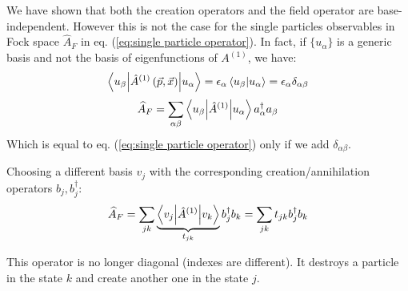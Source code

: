 We have shown that both the creation operators and the field operator are base-independent. However this is not the case for the single particles observables in Fock space $\widehat A_F$ in eq. (\ref{eq:single particle operator}). In fact, if $\{u_\alpha\}$ is a generic basis and not the basis of eigenfunctions of $A^{(1)}$, we have:
$$ \left\langle u_\beta \middle| \hat A^{(1)}\left(\vec p, \vec x\right) \middle| u_\alpha \right\rangle = \epsilon_\alpha \left\langle u_\beta \middle| u_\alpha \right\rangle = \epsilon_\alpha \delta_{\alpha\beta}$$
$$ \widehat A_F = \sum_{\alpha \beta} \left\langle u_\beta \middle| \hat A^{(1)} \middle| u_\alpha \right\rangle a_\alpha^\dag a_\beta$$
Which is equal to eq. (\ref{eq:single particle operator}) only if we add $\delta_{\alpha\beta}$. 

Choosing a different basis $v_j$ with the corresponding creation/annihilation operators $b_j,b_j^\dag$:
$$\widehat A_F = \sum_{jk} \underbrace{\left\langle v_j \middle| \hat A^{(1)} \middle| v_k \right\rangle}_{t_{jk}}b_j^\dag b_k  = \sum_{jk} t_{jk} b_j^\dag b_k$$

This operator is no longer diagonal (indexes are different). It destroys a particle in the state $k$ and create another one in the state $j$.\\

